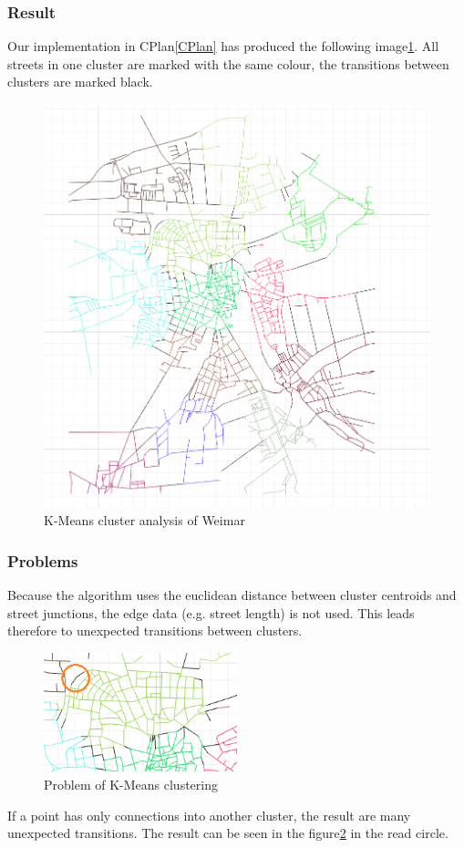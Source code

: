 \documentclass[11pt, a4paper]{report}
\begin{document}
\pagebreak
\subsubsection{Result}
Our implementation in CPlan\ref{CPlan} has produced the following image\ref{fig:KmeansGenerated}. All streets in one cluster are marked with the same colour, the transitions between clusters are marked black.
\begin{figure}[!h]
    \centering
    \includegraphics[width=\textwidth]{clusteranalysis_kmeans_result.png}
    \caption{K-Means cluster analysis of Weimar\label{fig:KmeansGenerated}}
\end{figure}
\pagebreak
\subsubsection{Problems}
Because the algorithm uses the euclidean distance between cluster centroids and street junctions, the edge data (e.g. street length) is not used. This leads therefore to unexpected transitions between clusters.
\begin{figure}[!h]
    \centering
    \includegraphics[width=0.5\textwidth]{clusteranalysis_kmeans_problem.png}
    \caption{Problem of K-Means clustering\label{fig:KmeansProblem}}
\end{figure}
\newline
If a point has only connections into another cluster, the result are many unexpected transitions. The result can be seen in the figure\ref{fig:KmeansProblem} in the read circle.
\pagebreak
\end{document}
